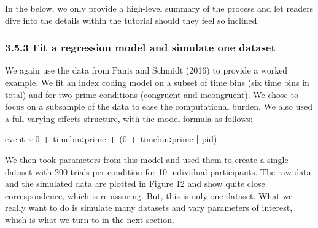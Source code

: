 \documentclass[
  man, donotrepeattitle,floatsintext]{apa6}
\newenvironment{Shaded}{\begin{snugshade}}{\end{snugshade}}
\newcommand{\DecValTok}[1]{\textcolor[rgb]{0.00,0.00,0.81}{#1}}
\newcommand{\NormalTok}[1]{#1}
\newcommand{\SpecialCharTok}[1]{\textcolor[rgb]{0.81,0.36,0.00}{\textbf{#1}}}
\begin{document}
In the below, we only provide a high-level summary of the process and let readers dive into the details within the tutorial should they feel so inclined.

\subsubsection{3.5.3 Fit a regression model and simulate one dataset}\label{fit-a-regression-model-and-simulate-one-dataset}

We again use the data from Panis and Schmidt (2016) to provide a worked example.
We fit an index coding model on a subset of time bins (six time bins in total) and for two prime conditions (congruent and incongruent). We chose to focus on a subsample of the data to ease the computational burden. We also used a full varying effects structure, with the model formula as follows:

\begin{Shaded}
\begin{Highlighting}[]
\NormalTok{event }\SpecialCharTok{\textasciitilde{}} \DecValTok{0} \SpecialCharTok{+}\NormalTok{ timebin}\SpecialCharTok{:}\NormalTok{prime }\SpecialCharTok{+}\NormalTok{ (}\DecValTok{0} \SpecialCharTok{+}\NormalTok{ timebin}\SpecialCharTok{:}\NormalTok{prime }\SpecialCharTok{|}\NormalTok{ pid)}
\end{Highlighting}
\end{Shaded}

We then took parameters from this model and used them to create a single dataset with 200 trials per condition for 10 individual participants. The raw data and the simulated data are plotted in Figure 12 and show quite close correspondence, which is re-assuring. But, this is only one dataset. What we really want to do is simulate many datasets and vary parameters of interest, which is what we turn to in the next section.
\end{document}
